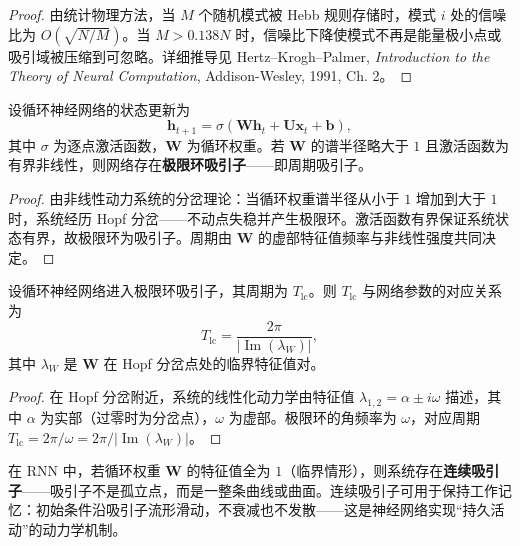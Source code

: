 \begin{proof}
由统计物理方法，当 $M$ 个随机模式被 Hebb 规则存储时，模式 $i$ 处的信噪比为 $O(\sqrt{N/M})$。当 $M>0.138N$ 时，信噪比下降使模式不再是能量极小点或吸引域被压缩到可忽略。详细推导见 Hertz--Krogh--Palmer, \textit{Introduction to the Theory of Neural Computation}, Addison-Wesley, 1991, Ch. 2。
\end{proof}

\begin{theorem}[循环神经网络的极限环吸引子]\label{thm:hopfield_limit_cycle}
设循环神经网络的状态更新为
\[
\mathbf{h}_{t+1}=\sigma(\mathbf{W}\mathbf{h}_t+\mathbf{U}\mathbf{x}_t+\mathbf{b}),
\]
其中 $\sigma$ 为逐点激活函数，$\mathbf{W}$ 为循环权重。若 $\mathbf{W}$ 的谱半径略大于 $1$ 且激活函数为有界非线性，则网络存在\textbf{极限环吸引子}——即周期吸引子。
\end{theorem}

\begin{proof}
由非线性动力系统的分岔理论：当循环权重谱半径从小于 $1$ 增加到大于 $1$ 时，系统经历 Hopf 分岔——不动点失稳并产生极限环。激活函数有界保证系统状态有界，故极限环为吸引子。周期由 $\mathbf{W}$ 的虚部特征值频率与非线性强度共同决定。
\end{proof}

\begin{proposition}[极限环吸引子的周期条件]\label{prop:limit_cycle_period}
设循环神经网络进入极限环吸引子，其周期为 $T_{\text{lc}}$。则 $T_{\text{lc}}$ 与网络参数的对应关系为
\[
T_{\text{lc}}=\frac{2\pi}{|\operatorname{Im}(\lambda_W)|},
\]
其中 $\lambda_W$ 是 $\mathbf{W}$ 在 Hopf 分岔点处的临界特征值对。
\end{proposition}

\begin{proof}
在 Hopf 分岔附近，系统的线性化动力学由特征值 $\lambda_{1,2}=\alpha\pm i\omega$ 描述，其中 $\alpha$ 为实部（过零时为分岔点），$\omega$ 为虚部。极限环的角频率为 $\omega$，对应周期 $T_{\text{lc}}=2\pi/\omega=2\pi/|\operatorname{Im}(\lambda_W)|$。
\end{proof}

\begin{example}[连续吸引子与记忆保持]\label{ex:continuous_attractor}
在 RNN 中，若循环权重 $\mathbf{W}$ 的特征值全为 $1$（临界情形），则系统存在\textbf{连续吸引子}——吸引子不是孤立点，而是一整条曲线或曲面。连续吸引子可用于保持工作记忆：初始条件沿吸引子流形滑动，不衰减也不发散——这是神经网络实现“持久活动”的动力学机制。
\end{example}

